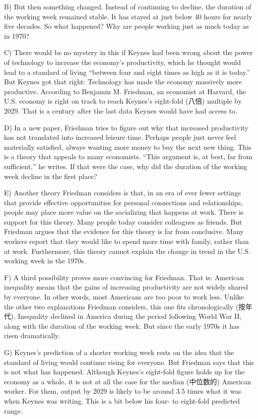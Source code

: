 \documentclass[UTF8,11pt]{ctexart}
\begin{document}
B) But then something changed. Instead of continuing to decline, the duration of the working week remained stable. It has stayed at just below 40 hours for nearly five decades. So what happened? Why are people working just as much today as in 1970?


C) There would be no mystery in this if Keynes had been wrong about the power of technology to increase the economy’s productivity, which he thought would lead to a standard of living “between four and eight times as high as it is today.” But Keynes got that right: Technology has made the economy massively more productive. According to Benjamin M. Friedman, an economist at Harvard, the U.S. economy is right on track to reach Keynes’s eight-fold (八倍) multiple by 2029. That is a century after the last data Keynes would have had access to.


D) In a new paper, Friedman tries to figure out why that increased productivity has not translated into increased leisure time. Perhaps people just never feel materially satisfied, always wanting more money to buy the next new thing. This is a theory that appeals to many economists. “This argument is, at best, far from sufficient,” he writes. If that were the case, why did the duration of the working week decline in the first place?


E) Another theory Friedman considers is that, in an era of ever fewer settings that provide effective opportunities for personal connections and relationships, people may place more value on the socializing that happens at work. There is support for this theory. Many people today consider colleagues as friends. But Friedman argues that the evidence for this theory is far from conclusive. Many workers report that they would like to spend more time with family, rather than at work. Furthermore, this theory cannot explain the change in trend in the U.S. working week in the 1970s.


F) A third possibility proves more convincing for Friedman. That is: American inequality means that the gains of increasing productivity are not widely shared by everyone. In other words, most Americans are too poor to work less. Unlike the other two explanations Friedman considers, this one fits chronologically (按年代). Inequality declined in America during the period following World War II, along with the duration of the working week. But since the early 1970s it has risen dramatically.


G) Keynes’s prediction of a shorter working week rests on the idea that the standard of living would continue rising for everyone. But Friedman says that this is not what has happened. Although Keynes’s eight-fold figure holds up for the economy as a whole, it is not at all the case for the median (中位数的) American worker. For them, output by 2029 is likely to be around 3.5 times what it was when Keynes was writing. This is a bit below his four- to eight-fold predicted range.
\end{document}
